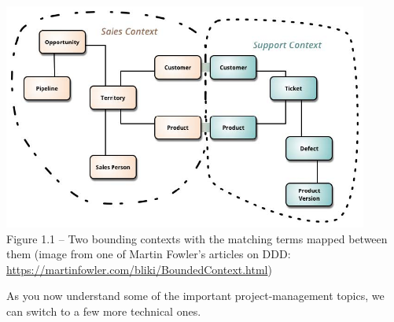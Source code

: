 \begin{center}
\includegraphics[width=0.9\textwidth]{content/1/chapter1/images/1.jpg}\\
Figure 1.1 – Two bounding contexts with the matching terms mapped between them (image from one of Martin Fowler's articles on DDD: \url{https://martinfowler.com/bliki/BoundedContext.html})
\end{center}

As you now understand some of the important project-management topics, we can switch to a few more technical ones.









